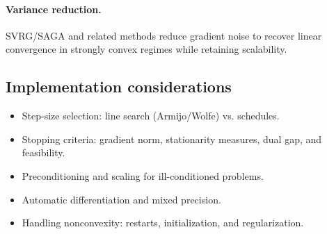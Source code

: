 \paragraph{Variance reduction.} SVRG/SAGA and related methods reduce gradient noise to recover linear convergence in strongly convex regimes while retaining scalability.

\subsection{Implementation considerations}
\begin{itemize}
  \item Step-size selection: line search (Armijo/Wolfe) vs. schedules.
  \item Stopping criteria: gradient norm, stationarity measures, dual gap, and feasibility.
  \item Preconditioning and scaling for ill-conditioned problems.
  \item Automatic differentiation and mixed precision.
  \item Handling nonconvexity: restarts, initialization, and regularization.
\end{itemize}